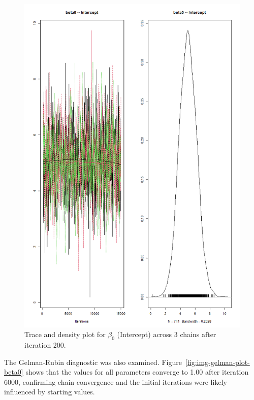 \documentclass[]{article}
\begin{document}
\begin{figure}[H]
	\centering
	\includegraphics[width=0.7\linewidth]{img/img-trace-beta0}
	\caption{Trace and density plot for $\beta_0$ (Intercept) across 3 chains after iteration 200.}
	\label{fig:img-trace-beta0}
\end{figure}


The Gelman-Rubin diagnostic was also examined. Figure~\ref{fig:img-gelman-plot-beta0} shows that the values for all parameters converge to 1.00 after iteration 6000, confirming chain convergence and the initial iterations were likely influenced by starting values.
\end{document}
